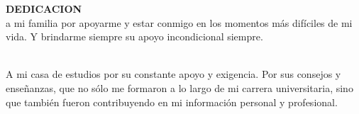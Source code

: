 \newenvironment{dedication}
  {\clearpage           %
   \thispagestyle{empty}%
   \vspace*{\stretch{3}}%
   \itshape             %
   \raggedleft          %
  }
  {\par %
   \vspace{\stretch{3}} %
   \clearpage           %
  }


\begin{dedication} 
  \large \textbf{DEDICACION} \\  
  \vspace{5mm}
  a mi familia por apoyarme y estar conmigo en los 
  momentos más difíciles de mi vida. Y brindarme siempre su apoyo incondicional 
  siempre. \\\

  A mi casa de estudios por su constante apoyo y exigencia. Por sus consejos y enseñanzas, que no sólo me formaron a lo largo de mi carrera universitaria, sino que también fueron contribuyendo en mi información personal y profesional.

\end{dedication}
